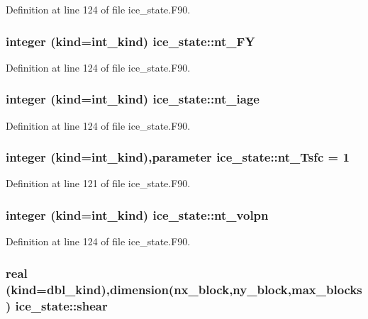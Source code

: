 Definition at line 124 of file ice\_\-state.F90.\hypertarget{namespaceice__state_a346a7cc45c174f3f489ba2e253bcf86f}{
\subsubsection[{nt\_\-FY}]{\setlength{\rightskip}{0pt plus 5cm}integer (kind=int\_\-kind) {\bf ice\_\-state::nt\_\-FY}}}
\label{namespaceice__state_a346a7cc45c174f3f489ba2e253bcf86f}


Definition at line 124 of file ice\_\-state.F90.\hypertarget{namespaceice__state_aeae23c004739caada7b1be2f39df0927}{
\subsubsection[{nt\_\-iage}]{\setlength{\rightskip}{0pt plus 5cm}integer (kind=int\_\-kind) {\bf ice\_\-state::nt\_\-iage}}}
\label{namespaceice__state_aeae23c004739caada7b1be2f39df0927}


Definition at line 124 of file ice\_\-state.F90.\hypertarget{namespaceice__state_a40b462400c0ddbc648e6aa0dd6a417b7}{
\subsubsection[{nt\_\-Tsfc}]{\setlength{\rightskip}{0pt plus 5cm}integer (kind=int\_\-kind),parameter {\bf ice\_\-state::nt\_\-Tsfc} = 1}}
\label{namespaceice__state_a40b462400c0ddbc648e6aa0dd6a417b7}


Definition at line 121 of file ice\_\-state.F90.\hypertarget{namespaceice__state_afd23d1c712e37876224466b8f6b41c9a}{
\subsubsection[{nt\_\-volpn}]{\setlength{\rightskip}{0pt plus 5cm}integer (kind=int\_\-kind) {\bf ice\_\-state::nt\_\-volpn}}}
\label{namespaceice__state_afd23d1c712e37876224466b8f6b41c9a}


Definition at line 124 of file ice\_\-state.F90.\hypertarget{namespaceice__state_aac4fe23f1dbcb435f711d8446d83dcca}{
\subsubsection[{shear}]{\setlength{\rightskip}{0pt plus 5cm}real (kind=dbl\_\-kind),dimension(nx\_\-block,ny\_\-block,max\_\-blocks) {\bf ice\_\-state::shear}}}
\label{namespaceice__state_aac4fe23f1dbcb435f711d8446d83dcca}


